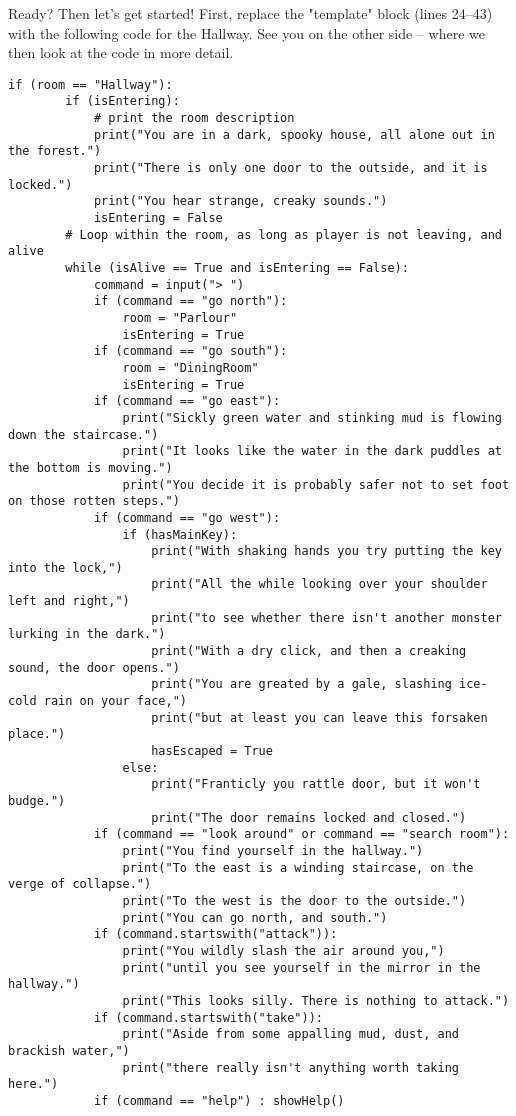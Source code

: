 Ready? Then let's get started! First, replace the "template" block (lines 24--43) with the following code for the Hallway. See you on the other side -- where we then look at the code in more detail.   

\begin{lstlisting}[firstnumber=24]
    if (room == "Hallway"):
        if (isEntering):
            # print the room description
            print("You are in a dark, spooky house, all alone out in the forest.")
            print("There is only one door to the outside, and it is locked.")
            print("You hear strange, creaky sounds.")
            isEntering = False
        # Loop within the room, as long as player is not leaving, and alive
        while (isAlive == True and isEntering == False):
            command = input("> ")
            if (command == "go north"):
                room = "Parlour"
                isEntering = True
            if (command == "go south"):
                room = "DiningRoom"
                isEntering = True
            if (command == "go east"):
                print("Sickly green water and stinking mud is flowing down the staircase.")
                print("It looks like the water in the dark puddles at the bottom is moving.")
                print("You decide it is probably safer not to set foot on those rotten steps.")
            if (command == "go west"):
                if (hasMainKey):
                    print("With shaking hands you try putting the key into the lock,")
                    print("All the while looking over your shoulder left and right,")
                    print("to see whether there isn't another monster lurking in the dark.")
                    print("With a dry click, and then a creaking sound, the door opens.")
                    print("You are greated by a gale, slashing ice-cold rain on your face,")
                    print("but at least you can leave this forsaken place.")
                    hasEscaped = True
                else:
                    print("Franticly you rattle door, but it won't budge.")
                    print("The door remains locked and closed.")
            if (command == "look around" or command == "search room"):
                print("You find yourself in the hallway.")
                print("To the east is a winding staircase, on the verge of collapse.")
                print("To the west is the door to the outside.")
                print("You can go north, and south.")
            if (command.startswith("attack")):
                print("You wildly slash the air around you,")
                print("until you see yourself in the mirror in the hallway.")
                print("This looks silly. There is nothing to attack.")
            if (command.startswith("take")):
                print("Aside from some appalling mud, dust, and brackish water,")
                print("there really isn't anything worth taking here.")
            if (command == "help") : showHelp()
\end{lstlisting} 

